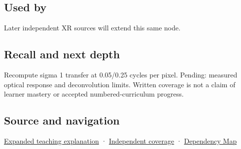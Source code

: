 \subsection{Used by}\label{appendix-8b76b0efd27f-used-by}

\hypertarget{appendix-8b76b0efd27f-used-by}{}

Later independent XR sources will extend this same node.

\subsection{Recall and next depth}\label{appendix-8b76b0efd27f-recall-and-next-depth}

\hypertarget{appendix-8b76b0efd27f-recall-and-next-depth}{}

Recompute sigma 1 transfer at 0.05/0.25 cycles per pixel. Pending: measured optical response and deconvolution limits. Written coverage is not a claim of learner mastery or accepted numbered-curriculum progress.

\subsection{Source and navigation}\label{appendix-8b76b0efd27f-source-and-navigation}

\hypertarget{appendix-8b76b0efd27f-source-and-navigation}{}

\hyperref[04-visual-computing-ii-ch042-a-footprint-is-more-meaningful-than-an-isolated-pixel-center]{Expanded teaching explanation} · \hyperref[appendix-fd090d982a15-xr01---independent-seeing-and-representation-source]{Independent coverage} · \hyperref[appendix-4ad47bdd269a]{Dependency Map}
